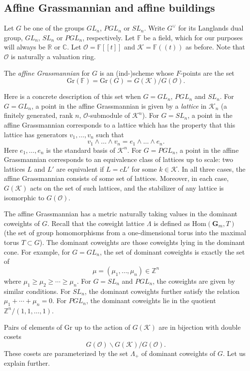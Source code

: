 \documentclass[10pt]{amsart}
\theoremstyle{definition}
\newcommand{\F}{\mathbb{F}}
\newcommand{\Z}{\mathbb{Z}}
\newcommand{\R}{\mathbb{R}}
\newcommand{\C}{\mathbb{C}}
\newcommand{\vG}{G^\vee}
\newcommand{\cO}{\mathcal{O}}
\newcommand{\cK}{\mathcal{K}}
\newcommand{\Gr}{\mathrm{Gr}}
\begin{document}
\subsection{Affine Grassmannian and affine buildings}

Let $G$ be one of the groups $GL_n$, $PGL_n$ or $SL_n$. Write $\vG$ for its Langlands dual group, $GL_n$, $SL_n$ or $PGL_n$, respectively. Let $\F$ be a field, which for our purposes will always be $\R$ or $\C$. Let $\cO=\F[[t]]$ and $\cK=\F((t))$ as before. Note that $\cO$ is naturally a valuation ring.


The \emph{affine Grassmannian} for $G$ is an (ind-)scheme whose $F$-points are the set
\[
\Gr(\F) = \Gr(G) = G(\cK)/G(\cO).
\]

Here is a concrete description of this set when $G=GL_n$, $PGL_n$ and $SL_n$. For $G=GL_n$, a point in the affine Grassmannian is given by a \emph{lattice} in $\cK_n$ (a finitely generated, rank $n$, $\cO$-submodule of $\cK^n$). For $G=SL_n$, a point in the affine Grassmannian corresponds to a lattice which has the property that this lattice has generators $v_1, \dots, v_n$ such that
\[
v_1 \wedge \dots \wedge v_n=e_1 \wedge \dots \wedge e_n.
\]
Here $e_1, \dots, e_n$ is the standard basis of $\cK^n$. For $G=PGL_n$, a point in the affine Grassmannian corresponds to an equivalence class of lattices up to scale: two lattices $L$ and $L'$ are equivalent if $L=cL'$ for some $k \in \cK$. In all three cases, the affine Grassmannian consists of some set of lattices. Moreover, in each case, $G(\cK)$ acts on the set of such lattices, and the stabilizer of any lattice is isomorphic to $G(\cO)$.

The affine Grassmannian has a metric naturally taking values in the dominant coweights of $G$. Recall that the coweight lattice $\Lambda$ is defined as $\mathrm{Hom}(\mathbf{G}_m,T)$ (the set of group homomorphisms from a one-dimensional torus into the maximal torus $T \subset G$). The dominant coweights are those coweights lying in the dominant cone. For example, for $G=GL_n$, the set of dominant coweights is exactly the set of 
\[
\mu=(\mu_1, \dots, \mu_n) \in \Z^n
\]
where $\mu_1 \geq \mu_2 \geq \cdots \geq \mu_n$. For $G=SL_n$ and $PGL_n$, the coweights are given by similar conditions. For $SL_n$, the dominant coweights further satisfy the relation $\mu_1+\cdots+\mu_n=0$. For $PGL_n$, the dominant coweights lie in the quotient $\Z^n/(1, 1, \dots, 1)$.

Pairs of elements of $\Gr$ up to the action of $G(\cK)$ are in bijection with double cosets 
\[
G(\cO) \backslash G(\cK) / G(\cO).
\]
 These cosets are parameterized by the set $\Lambda_+$ of dominant coweights of $G$. Let us explain further.
\end{document}
